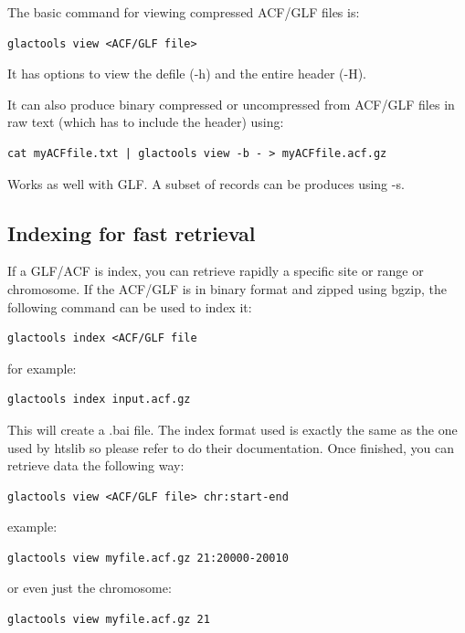 \documentclass[a4paper]{article}
\begin{document}
The basic command for viewing compressed ACF/GLF files is:

\begin{lstlisting}
glactools view <ACF/GLF file>
\end{lstlisting}

It has options to view the defile (-h) and the entire header (-H).

It can also produce binary compressed or uncompressed from ACF/GLF files in raw text (which has to include the header) using:
\begin{lstlisting}
cat myACFfile.txt | glactools view -b - > myACFfile.acf.gz
\end{lstlisting}
Works as well with GLF. A subset of records can be produces using -s.


\subsection{Indexing for fast retrieval}
\label{sec:indexing}
If a GLF/ACF is index, you can retrieve rapidly a specific site or range or chromosome. If the ACF/GLF is in binary format and zipped using bgzip, the following command can be used to index it:





\begin{lstlisting}
glactools index <ACF/GLF file
\end{lstlisting}

for example:
\begin{lstlisting}
glactools index input.acf.gz
\end{lstlisting}

This will create a .bai file. The index format used is exactly the same as the one used by htslib so please refer to do their documentation. Once finished, you can retrieve data the following way:

\begin{lstlisting}
glactools view <ACF/GLF file> chr:start-end
\end{lstlisting}

example:
\begin{lstlisting}
glactools view myfile.acf.gz 21:20000-20010
\end{lstlisting}
or even just the chromosome:

\begin{lstlisting}
glactools view myfile.acf.gz 21
\end{lstlisting}
\end{document}
